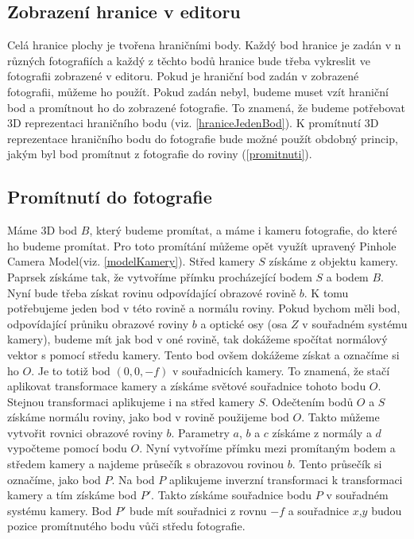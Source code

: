 \documentclass[11pt,twoside,a4paper]{book}
\begin{document}
\subsection{Zobrazení hranice v editoru}
Celá hranice plochy je tvořena hraničními body. Každý bod hranice je zadán v n různých fotografiích a každý z těchto bodů hranice bude třeba vykreslit ve fotografii zobrazené v editoru. Pokud je hraniční bod zadán v zobrazené fotografii, můžeme ho použít. Pokud zadán nebyl, budeme muset vzít hraniční bod a promítnout ho do zobrazené fotografie.  To znamená, že budeme potřebovat 3D reprezentaci hraničního bodu (viz. \ref{hraniceJedenBod}). K promítnutí 3D reprezentace hraničního bodu do fotografie bude možné použít obdobný princip, jakým byl bod promítnut z fotografie do roviny (\ref{promitnuti}).

\subsection{Promítnutí do fotografie}
\label{promitaniDoFotografie}
Máme 3D bod $B$, který budeme promítat, a máme i kameru fotografie, do které ho budeme promítat. Pro toto promítání můžeme opět využít upravený Pinhole Camera Model(viz. \ref{modelKamery}). Střed kamery $S$ získáme z objektu kamery. Paprsek získáme tak, že vytvoříme přímku procházející bodem $S$ a bodem $B$. Nyní bude třeba získat rovinu odpovídající obrazové rovině $b$. K tomu potřebujeme jeden bod v této rovině a normálu roviny. Pokud bychom měli bod, odpovídající průniku obrazové roviny $b$ a optické osy (osa $Z$ v souřadném systému kamery), budeme mít jak bod v oné rovině, tak dokážeme spočítat normálový vektor s pomocí středu kamery. Tento bod ovšem dokážeme získat a označíme si ho $O$.  Je to totiž bod $(0,0,-f)$ v souřadnicích kamery. To znamená, že stačí aplikovat transformace kamery a získáme světové souřadnice tohoto bodu $O$. Stejnou transformaci aplikujeme i na střed kamery $S$. Odečtením bodů $O$ a $S$ získáme normálu roviny, jako bod v rovině použijeme bod $O$. Takto můžeme vytvořit rovnici obrazové roviny $b$. Parametry $a$, $b$ a $c$ získáme z normály a $d$ vypočteme pomocí bodu $O$. Nyní vytvoříme přímku mezi promítaným bodem a středem kamery a najdeme průsečík s obrazovou rovinou $b$. Tento průsečík si označíme, jako bod $P$. Na bod $P$ aplikujeme inverzní transformaci k transformaci kamery a tím získáme bod $P'$. Takto získáme souřadnice bodu $P$ v souřadném systému kamery. Bod $P'$ bude mít souřadnici z rovnu $-f$ a souřadnice $x$,$y$ budou pozice promítnutého bodu vůči středu fotografie.
\end{document}
